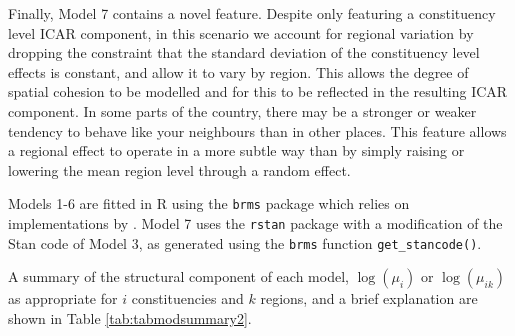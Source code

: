 \documentclass[webpdf,large,contemporary,namedate]{oup-authoring-template}
\theoremstyle{thmstyleone}
\theoremstyle{thmstyletwo}
\theoremstyle{thmstylethree}
\begin{document}
Finally, Model 7 contains a novel feature. Despite only featuring a
constituency level ICAR component, in this scenario we account for
regional variation by dropping the constraint that the standard
deviation of the constituency level effects is constant, and allow it to
vary by region. This allows the degree of spatial cohesion to be
modelled and for this to be reflected in the resulting ICAR component.
In some parts of the country, there may be a stronger or weaker tendency
to behave like your neighbours than in other places. This feature allows
a regional effect to operate in a more subtle way than by simply raising
or lowering the mean region level through a random effect.

Models 1-6 are fitted in R using the \texttt{brms} package which relies
on implementations by \citet{Morris2019}. Model 7 uses the
\texttt{rstan} package \citep{rstan2024} with a modification of the Stan
code of Model 3, as generated using the \texttt{brms} function
\texttt{get\_stancode()}.

A summary of the structural component of each model, \(\log(\mu_i)\) or
\(\log(\mu_{ik})\) as appropriate for \(i\) constituencies and \(k\)
regions, and a brief explanation are shown in Table
\ref{tab:tabmodsummary2}.
\end{document}

